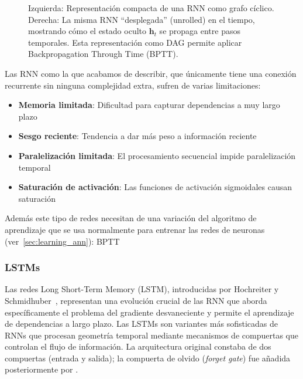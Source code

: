 \begin{figure}[h]
\caption[RNN compacta vs desplegada en el tiempo]{Izquierda: Representación compacta de una RNN como grafo cíclico. Derecha: La misma RNN ``desplegada'' (unrolled) en el tiempo, mostrando cómo el estado oculto $\mathbf{h}_t$ se propaga entre pasos temporales. Esta representación como DAG permite aplicar Backpropagation Through Time (BPTT).}
\label{fig:rnn_unrolled}
\end{figure}

Las \gls{RNN} como la que acabamos de describir, que únicamente tiene una conexión recurrente sin ninguna complejidad extra, sufren de varias limitaciones:
\begin{itemize}
	\item \textbf{Memoria limitada}: Dificultad para capturar dependencias a muy largo plazo
	\item \textbf{Sesgo reciente}: Tendencia a dar más peso a información reciente
	\item \textbf{Paralelización limitada}: El procesamiento secuencial impide paralelización temporal
	\item \textbf{Saturación de activación}: Las funciones de activación sigmoidales causan saturación
\end{itemize}

Además este tipo de redes necesitan de una variación del algoritmo de aprendizaje que se usa normalmente para entrenar las redes de neuronas (ver~\ref{sec:learning_ann}): \gls{BPTT}~\citep{werbos1990bptt}

\subsubsection{LSTMs}\label{subsubsec:lstm}

Las redes Long Short-Term Memory (\gls{LSTM}), introducidas por Hochreiter y Schmidhuber~\citep{hochreiter1997long}, representan una evolución crucial de las \gls{RNN} que aborda específicamente el problema del gradiente desvaneciente y permite el aprendizaje de dependencias a largo plazo. Las \glspl{LSTM} son variantes más sofisticadas de \glspl{RNN} que procesan geometría temporal mediante mecanismos de compuertas que controlan el flujo de información. La arquitectura original constaba de dos compuertas (entrada y salida); la compuerta de olvido (\textit{forget gate}) fue añadida posteriormente por \citet{gers2000learning}.

